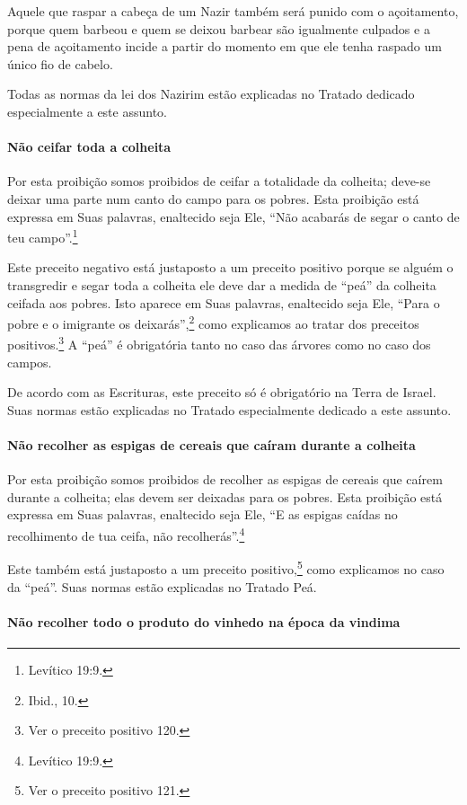 Aquele que raspar a cabeça de um Nazir também será punido com o
açoitamento, porque quem barbeou e quem se deixou barbear são
igualmente culpados e a pena de açoitamento incide a partir do momento
em que ele tenha raspado um único fio de cabelo.

Todas as normas da lei dos Nazirim estão explicadas no Tratado dedicado
especialmente a este assunto.

\paragraph{Não ceifar toda a colheita}

Por esta proibição somos proibidos de ceifar a totalidade da colheita;
deve-se deixar uma parte num canto do campo para os pobres. Esta
proibição está expressa em Suas palavras, enaltecido seja Ele, ``Não
acabarás de segar o canto de teu campo''.\footnote{Levítico 19:9.}

Este preceito negativo está justaposto a um preceito positivo porque se
alguém o transgredir e segar toda a colheita ele deve dar a medida de
``peá'' da colheita ceifada aos pobres. Isto aparece em Suas palavras,
enaltecido seja Ele, ``Para o pobre e o imigrante os deixarás'',\footnote{Ibid.,
10.} como explicamos ao tratar dos preceitos
positivos.\footnote{Ver o preceito positivo 120.} A ``peá'' é obrigatória tanto no caso
das árvores como no caso dos campos.

De acordo com as Escrituras, este preceito só é obrigatório na Terra de
Israel. Suas normas estão explicadas no Tratado especialmente dedicado a
este assunto.

\paragraph{Não recolher as espigas de cereais que caíram durante a colheita}

Por esta proibição somos proibidos de recolher as espigas de cereais que
caírem durante a colheita; elas devem ser deixadas para os pobres. Esta
proibição está expressa em Suas palavras, enaltecido seja Ele, ``E as
espigas caídas no recolhimento de tua ceifa, não recolherás''.\footnote{Levítico
19:9.}

Este também está justaposto a um preceito
positivo,\footnote{Ver o preceito positivo 121.} como explicamos no caso da ``peá''. Suas normas estão explicadas no Tratado Peá.

\paragraph{Não recolher todo o produto do vinhedo na época da vindima}

